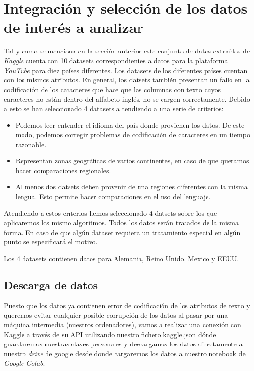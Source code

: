 \documentclass[a4paper,12pt]{article}
\begin{document}
\section{Integraci\'on y selecci\'on de los datos de inter\'es a analizar}

Tal y como se menciona en la secci\'on anterior este conjunto de datos extra\'idos de {\itshape Kaggle} cuenta con 10 datasets correspondientes a datos para la plataforma {\itshape YouTube} para diez pa\'ises diferentes. Los datasets de los diferentes pa\'ises cuentan con los mismos atributos. En general, los datsets tambi\'en presentan un fallo en la codificaci\'on de los caracteres que hace que las columnas con texto cuyos caracteres no est\'an dentro del alfabeto ingl\'es, no se cargen correctamente. Debido a esto se han seleccionado 4 datasets a tendiendo a una serie de criterios:

\begin{itemize}

\item Podemos leer entender el idioma del pa\'is donde provienen los datos. De este modo, podemos corregir problemas de codificaci\'on de caracteres en un tiempo razonable.
\item Representan zonas geogr\'aficas de varios continentes, en caso de que queramos hacer comparaciones regionales. 
\item Al menos dos datsets deben provenir de una regiones diferentes con la misma lengua. Esto permite hacer comparaciones en el uso del lenguaje.



\end{itemize} 

Atendiendo a estos criterios hemos seleccionado 4 datsets sobre  los que aplicaremos los mismo algoritmos. Todos los datos ser\'an tratados de la misma forma. En caso de que alg\'un dataset requiera un tratamiento especial en alg\'un punto se especificar\'a el motivo.

Los 4 datasets contienen datos para Alemania, Reino Unido, Mexico y EEUU.

\subsection{Descarga de datos}

Puesto que los datos ya contienen error de codificaci\'on de los atributos de texto y queremos evitar cualquier posible corrupci\'on de los datos al pasar por una m\'aquina intermedia (nuestros ordenadores), vamos a realizar una conexi\'on con Kaggle a trav\'es de su API utilizando nuestro fichero kaggle.json d\'onde guardaremos nuestras claves personales y descargamos los datos directamente a nuestro {\itshape drive} de google desde donde cargaremos los datos a nuestro notebook de {\itshape Google Colab}. 
\end{document}
